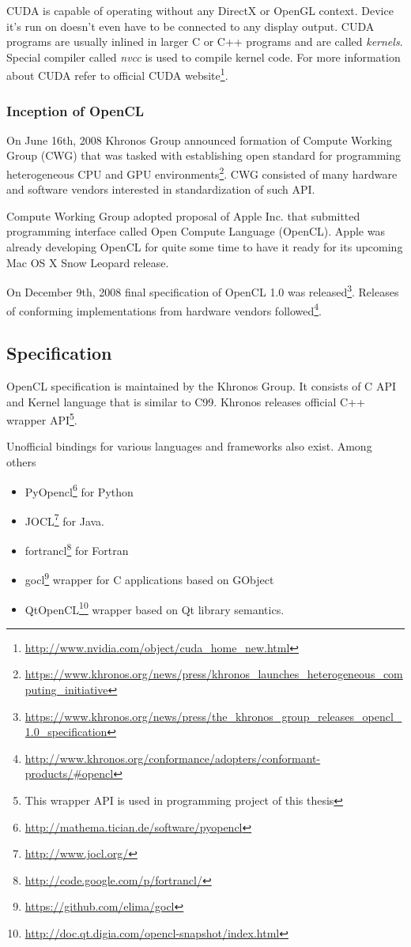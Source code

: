 CUDA is capable of operating without any DirectX or OpenGL context. Device it's
run on doesn't even have to be connected to any display output. CUDA programs
are usually inlined in larger C or C++ programs and are called \emph{kernels}.
Special compiler called \emph{nvcc} is used to compile kernel code. For more
information about CUDA refer to official CUDA website\footnote{\url{http://www.nvidia.com/object/cuda_home_new.html}}.

\subsubsection{Inception of OpenCL}

On June 16th, 2008 Khronos Group announced formation of Compute Working Group (CWG)
that was tasked with establishing open standard for programming heterogeneous
CPU and GPU environments\footnote{\url{https://www.khronos.org/news/press/khronos\_launches\_heterogeneous\_computing\_initiative}}.
CWG consisted of many hardware and software vendors interested in
standardization of such API.

Compute Working Group adopted proposal of Apple Inc. that submitted programming
interface called Open Compute Language (OpenCL). Apple was already developing
OpenCL for quite some time to have it ready for its upcoming Mac OS X Snow
Leopard release.

On December 9th, 2008 final specification of OpenCL 1.0 was
released\footnote{\url{https://www.khronos.org/news/press/the\_khronos\_group\_releases\_opencl\_1.0\_specification}}.
Releases of conforming implementations from hardware vendors followed\footnote{\url{http://www.khronos.org/conformance/adopters/conformant-products/\#opencl}}.

\subsection{Specification}
OpenCL specification is maintained by the Khronos Group. It consists of C API
and Kernel language that is similar to C99. Khronos releases official C++
wrapper API\footnote{This wrapper API is used in programming project of this thesis}.

Unofficial bindings for various languages and frameworks also exist. Among others
\begin{itemize}
	\item PyOpencl\footnote{\url{http://mathema.tician.de/software/pyopencl}}
		for Python
	\item JOCL\footnote{\url{http://www.jocl.org/}} for Java.
	\item fortrancl\footnote{\url{http://code.google.com/p/fortrancl/}} for Fortran
	\item gocl\footnote{\url{https://github.com/elima/gocl}} wrapper for C
		applications based on GObject
	\item QtOpenCL\footnote{\url{http://doc.qt.digia.com/opencl-snapshot/index.html}}
		wrapper based on Qt library semantics.
\end{itemize}

